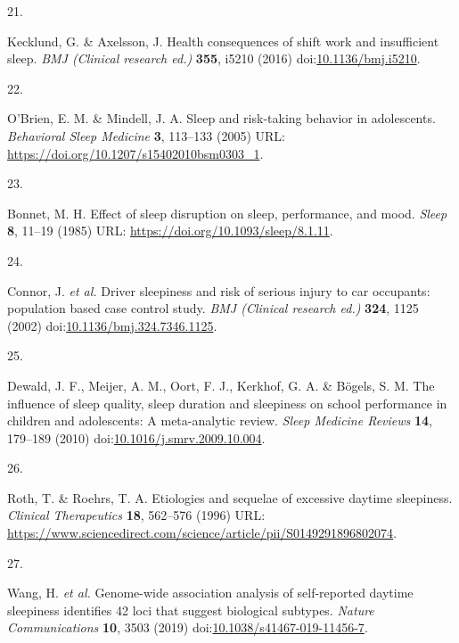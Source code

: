 \documentclass[
  10pt,
]{scrbook}
\newlength{\cslhangindent}
\newlength{\csllabelwidth}
\newlength{\cslentryspacingunit} %
\newenvironment{CSLReferences}[2] %
 {%
  \setlength{\parindent}{0pt}
  \ifodd #1
  \let\oldpar\par
  \def\par{\hangindent=\cslhangindent\oldpar}
  \fi
  \setlength{\parskip}{#2\cslentryspacingunit}
 }%
 {}
\newcommand{\CSLLeftMargin}[1]{\parbox[t]{\csllabelwidth}{#1}}
\newcommand{\CSLRightInline}[1]{\parbox[t]{\linewidth - \csllabelwidth}{#1}\break}
\begin{document}
\begin{CSLReferences}{0}{0}
\leavevmode{}%
\CSLLeftMargin{21. }%
\CSLRightInline{Kecklund, G. \& Axelsson, J. Health consequences of
shift work and insufficient sleep. \emph{BMJ (Clinical research ed.)}
\textbf{355}, i5210 (2016)
doi:\href{https://doi.org/10.1136/bmj.i5210}{10.1136/bmj.i5210}.}

\leavevmode{}%
\CSLLeftMargin{22. }%
\CSLRightInline{O'Brien, E. M. \& Mindell, J. A. Sleep and risk-taking
behavior in adolescents. \emph{Behavioral Sleep Medicine} \textbf{3},
113--133 (2005) URL: \url{https://doi.org/10.1207/s15402010bsm0303_1}.}

\leavevmode{}%
\CSLLeftMargin{23. }%
\CSLRightInline{Bonnet, M. H. Effect of sleep disruption on sleep,
performance, and mood. \emph{Sleep} \textbf{8}, 11--19 (1985) URL:
\url{https://doi.org/10.1093/sleep/8.1.11}.}

\leavevmode{}%
\CSLLeftMargin{24. }%
\CSLRightInline{Connor, J. \emph{et al.} Driver sleepiness and risk of
serious injury to car occupants: population based case control study.
\emph{BMJ (Clinical research ed.)} \textbf{324}, 1125 (2002)
doi:\href{https://doi.org/10.1136/bmj.324.7346.1125}{10.1136/bmj.324.7346.1125}.}

\leavevmode{}%
\CSLLeftMargin{25. }%
\CSLRightInline{Dewald, J. F., Meijer, A. M., Oort, F. J., Kerkhof, G.
A. \& Bögels, S. M. The influence of sleep quality, sleep duration and
sleepiness on school performance in children and adolescents: A
meta-analytic review. \emph{Sleep Medicine Reviews} \textbf{14},
179--189 (2010)
doi:\href{https://doi.org/10.1016/j.smrv.2009.10.004}{10.1016/j.smrv.2009.10.004}.}

\leavevmode{}%
\CSLLeftMargin{26. }%
\CSLRightInline{Roth, T. \& Roehrs, T. A. Etiologies and sequelae of
excessive daytime sleepiness. \emph{Clinical Therapeutics} \textbf{18},
562--576 (1996) URL:
\url{https://www.sciencedirect.com/science/article/pii/S0149291896802074}.}

\leavevmode{}%
\CSLLeftMargin{27. }%
\CSLRightInline{Wang, H. \emph{et al.} Genome-wide association analysis
of self-reported daytime sleepiness identifies 42 loci that suggest
biological subtypes. \emph{Nature Communications} \textbf{10}, 3503
(2019)
doi:\href{https://doi.org/10.1038/s41467-019-11456-7}{10.1038/s41467-019-11456-7}.}


\end{CSLReferences}
\end{document}
